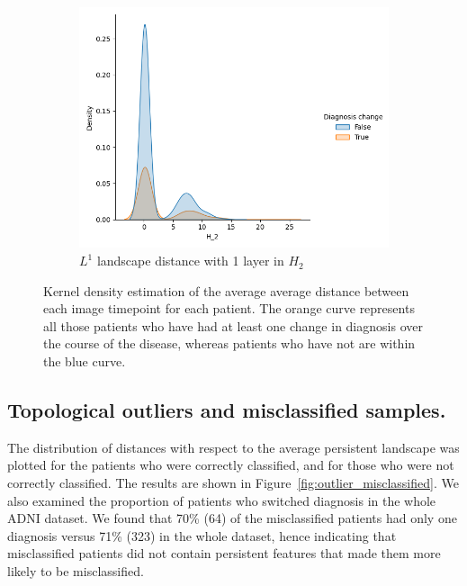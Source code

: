 \documentclass{article}
\begin{document}
\begin{figure}
\begin{subfigure}{0.32\textwidth}
    \includegraphics[width=\textwidth]{figures/temporal_evolution/landscape_H_2_dist_diag_change.png}
    \caption{$L^{1}$ landscape distance with 1 layer in $H_2$}
  \end{subfigure}
  \caption{Kernel density estimation of the average average distance between each image timepoint for each patient. The orange curve represents all those patients who have had at least one change in diagnosis over the course of the disease, whereas patients who have not are within the blue curve.}
  \label{fig:kde_intra_patient}
\end{figure}

\subsection{Topological outliers and misclassified samples.}

The distribution of distances with respect to the average persistent landscape was plotted for the patients who were correctly classified, and for those who were not correctly classified. The results are shown in Figure~\ref{fig:outlier_misclassified}. We also examined the proportion of patients who switched diagnosis in the whole ADNI dataset. We found that 70\% (64) of the misclassified patients had only one diagnosis versus 71\% (323) in the whole dataset, hence indicating that misclassified patients did not contain persistent features that made them more likely to be misclassified.
\end{document}
